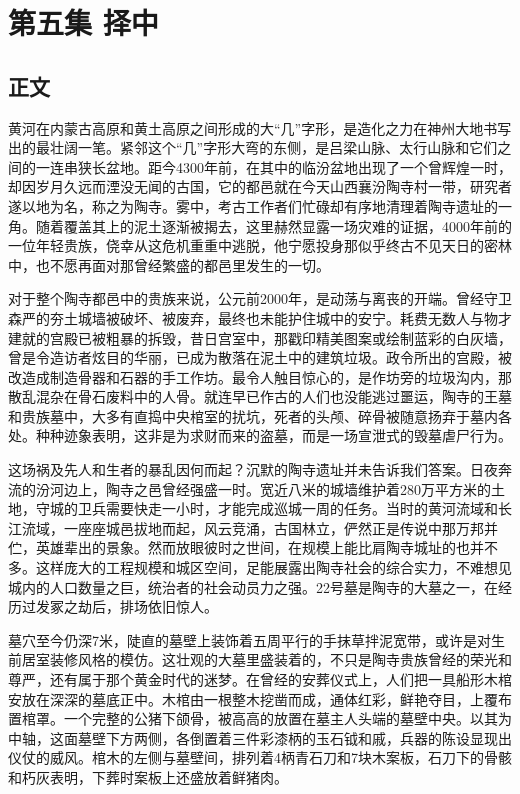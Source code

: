 \chapter{第五集 \quad 择中}

\section{正文}


黄河在内蒙古高原和黄土高原之间形成的大“几”字形，是造化之力在神州大地书写出的最壮阔一笔。紧邻这个“几”字形大弯的东侧，是吕梁山脉、太行山脉和它们之间的一连串狭长盆地。距今4300年前，在其中的临汾盆地出现了一个曾辉煌一时，却因岁月久远而湮没无闻的古国，它的都邑就在今天山西襄汾陶寺村一带，研究者遂以地为名，称之为陶寺。雾中，考古工作者们忙碌却有序地清理着陶寺遗址的一角。随着覆盖其上的泥土逐渐被揭去，这里赫然显露一场灾难的证据，4000年前的一位年轻贵族，侥幸从这危机重重中逃脱，他宁愿投身那似乎终古不见天日的密林中，也不愿再面对那曾经繁盛的都邑里发生的一切。

对于整个陶寺都邑中的贵族来说，公元前2000年，是动荡与离丧的开端。曾经守卫森严的夯土城墙被破坏、被废弃，最终也未能护住城中的安宁。耗费无数人与物才建就的宫殿已被粗暴的拆毁，昔日宫室中，那戳印精美图案或绘制蓝彩的白灰墙，曾是令造访者炫目的华丽，已成为散落在泥土中的建筑垃圾。政令所出的宫殿，被改造成制造骨器和石器的手工作坊。最令人触目惊心的，是作坊旁的垃圾沟内，那散乱混杂在骨石废料中的人骨。就连早已作古的人们也没能逃过噩运，陶寺的王墓和贵族墓中，大多有直捣中央棺室的扰坑，死者的头颅、碎骨被随意扬弃于墓内各处。种种迹象表明，这非是为求财而来的盗墓，而是一场宣泄式的毁墓虐尸行为。

这场祸及先人和生者的暴乱因何而起？沉默的陶寺遗址并未告诉我们答案。日夜奔流的汾河边上，陶寺之邑曾经强盛一时。宽近八米的城墙维护着280万平方米的土地，守城的卫兵需要快走一小时，才能完成巡城一周的任务。当时的黄河流域和长江流域，一座座城邑拔地而起，风云竞涌，古国林立，俨然正是传说中那万邦并伫，英雄辈出的景象。然而放眼彼时之世间，在规模上能比肩陶寺城址的也并不多。这样庞大的工程规模和城区空间，足能展露出陶寺社会的综合实力，不难想见城内的人口数量之巨，统治者的社会动员力之强。22号墓是陶寺的大墓之一，在经历过发冢之劫后，排场依旧惊人。

墓穴至今仍深7米，陡直的墓壁上装饰着五周平行的手抹草拌泥宽带，或许是对生前居室装修风格的模仿。这壮观的大墓里盛装着的，不只是陶寺贵族曾经的荣光和尊严，还有属于那个黄金时代的迷梦。在曾经的安葬仪式上，人们把一具船形木棺安放在深深的墓底正中。木棺由一根整木挖凿而成，通体红彩，鲜艳夺目，上覆布置棺罩。一个完整的公猪下颌骨，被高高的放置在墓主人头端的墓壁中央。以其为中轴，这面墓壁下方两侧，各倒置着三件彩漆柄的玉石钺和戚，兵器的陈设显现出仪仗的威风。棺木的左侧与墓壁间，排列着4柄青石刀和7块木案板，石刀下的骨骸和朽灰表明，下葬时案板上还盛放着鲜猪肉。

